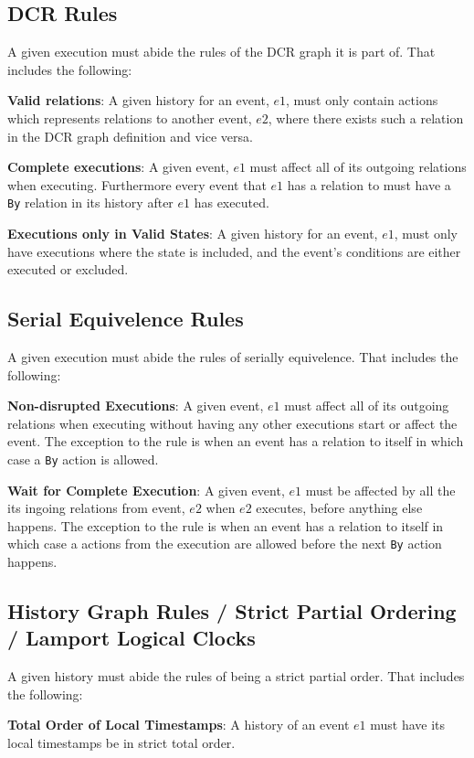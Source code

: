 	\subsection{DCR Rules}
	A given execution must abide the rules of the DCR graph it is part of. That includes the following:
	
	\newpar \textbf{Valid relations}: A given history for an event, $e1$, must only contain actions which represents relations to another event, $e2$, where there exists such a relation in the DCR graph definition and vice versa. 
	
	\newpar \textbf{Complete executions}: A given event, $e1$ must affect all of its outgoing relations when executing. Furthermore every event that $e1$ has a relation to must have a \texttt{By} relation in its history after $e1$ has executed.
	
	\newpar \textbf{Executions only in Valid States}: A given history for an event, $e1$, must only have executions where the state is included, and the event's conditions are either executed or excluded.
	
	\subsection{Serial Equivelence Rules}
	A given execution must abide the rules of serially equivelence. That includes the following:
	
	\newpar \textbf{Non-disrupted Executions}: A given event, $e1$ must affect all of its outgoing relations when executing without having any other executions start or affect the event. The exception to the rule is when an event has a relation to itself in which case a \texttt{By} action is allowed.
	
	\newpar \textbf{Wait for Complete Execution}: A given event, $e1$ must be affected by all the its ingoing relations from event, $e2$ when $e2$ executes, before anything else happens. The exception to the rule is when an event has a relation to itself in which case a actions from the execution are allowed before the next \texttt{By} action happens. 
	
	\subsection{History Graph Rules / Strict Partial Ordering / Lamport Logical Clocks}
	A given history must abide the rules of being a strict partial order. That includes the following:
	
	\newpar \textbf{Total Order of Local Timestamps}: A history of an event $e1$ must have its local timestamps be in strict total order.
	
